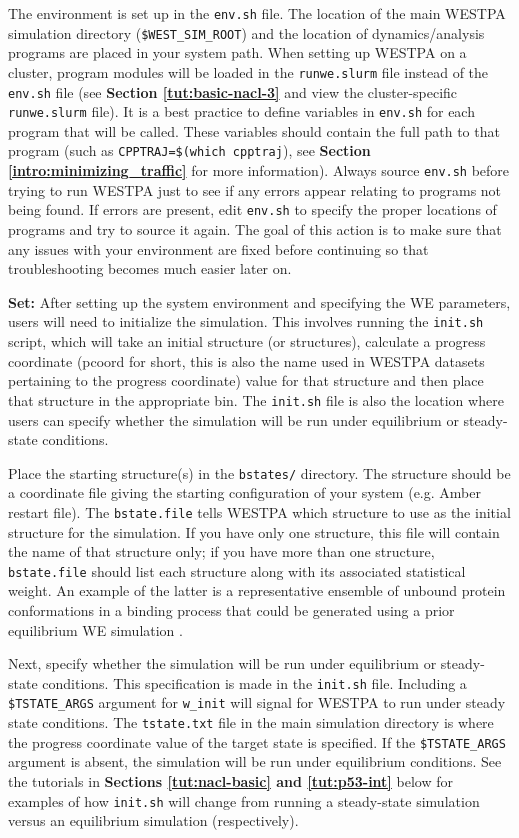 The environment is set up in the \verb|env.sh| file. 
The location of the main WESTPA simulation directory (\verb|$WEST_SIM_ROOT|) and the location of dynamics/analysis programs are placed in your system path. 
When setting up WESTPA on a cluster, program modules will be loaded in the \verb|runwe.slurm| file instead of the \verb|env.sh| file (see \textbf{Section \ref{tut:basic-nacl-3}} and view the cluster-specific \verb|runwe.slurm| file). 
It is a best practice to define variables in \verb|env.sh| for each program that will be called. 
These variables should contain the full path to that program (such as \verb|CPPTRAJ=$(which cpptraj|), see \textbf{Section \ref{intro:minimizing_traffic}} for more information). 
Always source \verb|env.sh| before trying to run WESTPA just to see if any errors appear relating to programs not being found. 
If errors are present, edit \verb|env.sh| to specify the proper locations of programs and try to source it again. 
The goal of this action is to make sure that any issues with your environment are fixed before continuing so that troubleshooting becomes much easier later on. 

\textbf{Set:} After setting up the system environment and specifying the WE parameters, users will need to initialize the simulation. 
This involves running the \verb|init.sh| script, which will take an initial structure (or structures), calculate a progress coordinate (pcoord for short, this is also the name used in WESTPA datasets pertaining to the progress coordinate) value for that structure and then place that structure in the appropriate bin. 
The \verb|init.sh| file is also the location where users can specify whether the simulation will be run under equilibrium or steady-state conditions. 

Place the starting structure(s) in the \verb|bstates/| directory. 
The structure should be a coordinate file giving the starting configuration of your system (e.g. Amber restart file). 
The \verb|bstate.file| tells WESTPA which structure to use as the initial structure for the simulation. 
If you have only one structure, this file will contain the name of that structure only; if you have more than one structure, \verb|bstate.file| should list each structure along with its associated statistical weight. 
An example of the latter is a representative ensemble of unbound protein conformations in a binding process that could be generated using a prior equilibrium WE simulation \citep{zwier_efficient_2016,saglam_proteinprotein_2019}. 

Next, specify whether the simulation will be run under equilibrium or steady-state conditions. 
This specification is made in the \verb|init.sh| file. 
Including a \verb|$TSTATE_ARGS| argument for \verb|w_init| will signal for WESTPA to run under steady state conditions. 
The \verb|tstate.txt| file in the main simulation directory is where the progress coordinate value of the target state is specified. 
If the \verb|$TSTATE_ARGS| argument is absent, the simulation will be run under equilibrium conditions. 
See the tutorials in \textbf{Sections \ref{tut:nacl-basic} and \ref{tut:p53-int}} below for examples of how \verb|init.sh| will change from running a steady-state simulation versus an equilibrium simulation (respectively).

